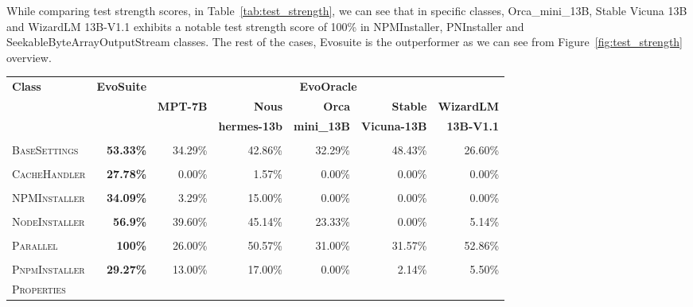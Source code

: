 While comparing test strength scores, in Table~\ref{tab:test_strength}, we can see that in specific classes, Orca\_mini\_13B, Stable Vicuna 13B and WizardLM 13B-V1.1 exhibits a notable test strength score of 100\% in NPMInstaller, PNInstaller and SeekableByteArrayOutputStream classes. The rest of the cases, Evosuite is the outperformer as we can see from Figure~\ref{fig:test_strength} overview.

\begin{table}[H]
\centering

\begin{tabular}{| l | r | r | r | r | r | r |}
\hline
\multirow{2}{*}{\textbf{Class}} & \multirow{2}{*}{\textbf{EvoSuite}} & \multicolumn{5}{c|}{\textbf{EvoOracle}} \\ %
\cline{3-7} %
 &  & \textbf{MPT-7B} & \textbf{Nous} & \textbf{Orca} & \textbf{Stable} & \textbf{WizardLM} \\
 &  &  & \textbf{hermes-13b} & \textbf{mini\_13B} & \textbf{Vicuna-13B} & \textbf{13B-V1.1} \\
\hline
\scriptsize\textsc{} &  &  &  &  &  &  \\
\scriptsize\textsc{BaseSettings} & \textbf{53.33\%} & 34.29\% & 42.86\% & 32.29\% & 48.43\% & 26.60\% \\
\hline
\scriptsize\textsc{} &  &  &  &  &  &  \\
\scriptsize\textsc{CacheHandler} & \textbf{27.78\%} & 0.00\% & 1.57\% & 0.00\% & 0.00\% & 0.00\% \\
\hline
\scriptsize\textsc{} &  &  &  &  &  &  \\
\scriptsize\textsc{NPMInstaller} & \textbf{34.09\%} & 3.29\% & 15.00\% & 0.00\% & 0.00\% & 0.00\% \\
\hline
\scriptsize\textsc{} &  &  &  &  &  &  \\
\scriptsize\textsc{NodeInstaller} & \textbf{56.9\%} & 39.60\% & 45.14\% & 23.33\% & 0.00\% & 5.14\% \\
\hline
\scriptsize\textsc{} &  &  &  &  &  &  \\
\scriptsize\textsc{Parallel} & \textbf{100\%} & 26.00\% & 50.57\% & 31.00\% & 31.57\% & 52.86\% \\
\hline
\scriptsize\textsc{} &  &  &  &  &  &  \\
\scriptsize\textsc{PnpmInstaller} & \textbf{29.27\%} & 13.00\% & 17.00\% & 0.00\% & 2.14\% & 5.50\% \\
\hline
\scriptsize\textsc{Properties} &  &  &  &  &  &  \\

\end{tabular}
\end{table}
